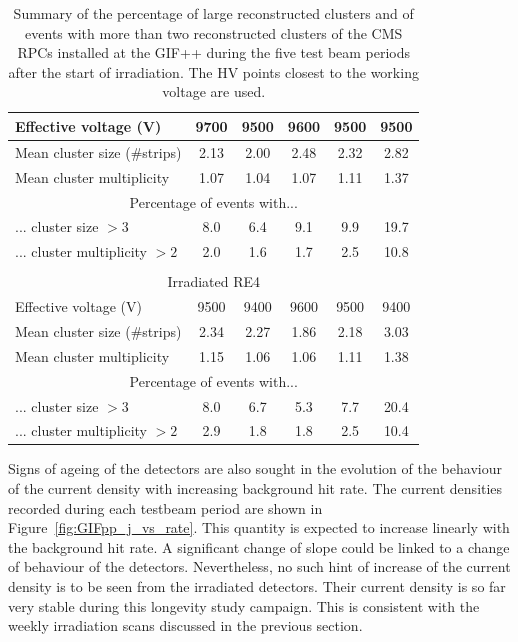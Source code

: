 \begin{table}[H]
\begin{tabular}{|l|*{5}{c|}}
			\hline
			Effective voltage (V)         & 9700 & 9500 & 9600 & 9500 & 9500 \\
			\hline
			Mean cluster size (\#strips)  & 2.13 & 2.00 & 2.48 & 2.32 & 2.82 \\
			\hline
			Mean cluster multiplicity     & 1.07 & 1.04 & 1.07 & 1.11 & 1.37 \\
			\hline
			\multicolumn{6}{|c|}{Percentage of events with...}               \\
			\hline
			... cluster size $>3$         & 8.0  & 6.4  & 9.1  & 9.9  & 19.7 \\
			\hline
			... cluster multiplicity $>2$ & 2.0  & 1.6  & 1.7  & 2.5  & 10.8 \\
			\hline
			\multicolumn{6}{c}{}                                             \\
			\hline
			\multicolumn{6}{|c|}{Irradiated RE4}                             \\
			\hline
			Effective voltage (V)         & 9500 & 9400 & 9600 & 9500 & 9400 \\
			\hline
			Mean cluster size (\#strips)  & 2.34 & 2.27 & 1.86 & 2.18 & 3.03 \\
			\hline
			Mean cluster multiplicity     & 1.15 & 1.06 & 1.06 & 1.11 & 1.38 \\
			\hline
			\multicolumn{6}{|c|}{Percentage of events with...}               \\
			\hline
			... cluster size $>3$         & 8.0  & 6.7  & 5.3  & 7.7  & 20.4 \\
			\hline
			... cluster multiplicity $>2$ & 2.9  & 1.8  & 1.8  & 2.5  & 10.4 \\
			\hline
		\end{tabular}
		\caption{\label{tab:clusters} Summary of the percentage of large reconstructed clusters and of events with more than two reconstructed clusters of the CMS RPCs installed at the GIF++ during the five test beam periods after the start of irradiation. The HV points closest to the working voltage are used.}
	\end{table}
	
	Signs of ageing of the detectors are also sought in the evolution of the behaviour of the current density with increasing background hit rate. The current densities recorded during each testbeam period are shown in Figure~\ref{fig:GIFpp_j_vs_rate}. This quantity is expected to increase linearly with the background hit rate. A significant change of slope could be linked to a change of behaviour of the detectors. Nevertheless, no such hint of increase of the current density is to be seen from the irradiated detectors. Their current density is so far very stable during this longevity study campaign. This is consistent with the weekly irradiation scans discussed in the previous section.
	
